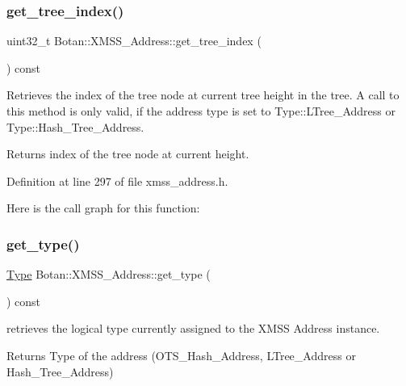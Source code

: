 \subsubsection{\texorpdfstring{get\+\_\+tree\+\_\+index()}{get\_tree\_index()}}
{\footnotesize\ttfamily uint32\+\_\+t Botan\+::\+X\+M\+S\+S\+\_\+\+Address\+::get\+\_\+tree\+\_\+index (\begin{DoxyParamCaption}{ }\end{DoxyParamCaption}) const\hspace{0.3cm}{\ttfamily [inline]}}

Retrieves the index of the tree node at current tree height in the tree. A call to this method is only valid, if the address type is set to Type\+::\+L\+Tree\+\_\+\+Address or Type\+::\+Hash\+\_\+\+Tree\+\_\+\+Address.

\begin{DoxyReturn}{Returns}
index of the tree node at current height. 
\end{DoxyReturn}


Definition at line 297 of file xmss\+\_\+address.\+h.

Here is the call graph for this function\+:
\mbox{\label{class_botan_1_1_x_m_s_s___address_a278cf3ba854261fd2c73fbc996fb89b1}} 
\subsubsection{\texorpdfstring{get\+\_\+type()}{get\_type()}}
{\footnotesize\ttfamily \mbox{\hyperlink{class_botan_1_1_x_m_s_s___address_a0101e45c5608cf312b497bf6d855000e}{Type}} Botan\+::\+X\+M\+S\+S\+\_\+\+Address\+::get\+\_\+type (\begin{DoxyParamCaption}{ }\end{DoxyParamCaption}) const\hspace{0.3cm}{\ttfamily [inline]}}

retrieves the logical type currently assigned to the X\+M\+SS Address instance.

\begin{DoxyReturn}{Returns}
Type of the address (O\+T\+S\+\_\+\+Hash\+\_\+\+Address, L\+Tree\+\_\+\+Address or Hash\+\_\+\+Tree\+\_\+\+Address) 
\end{DoxyReturn}


